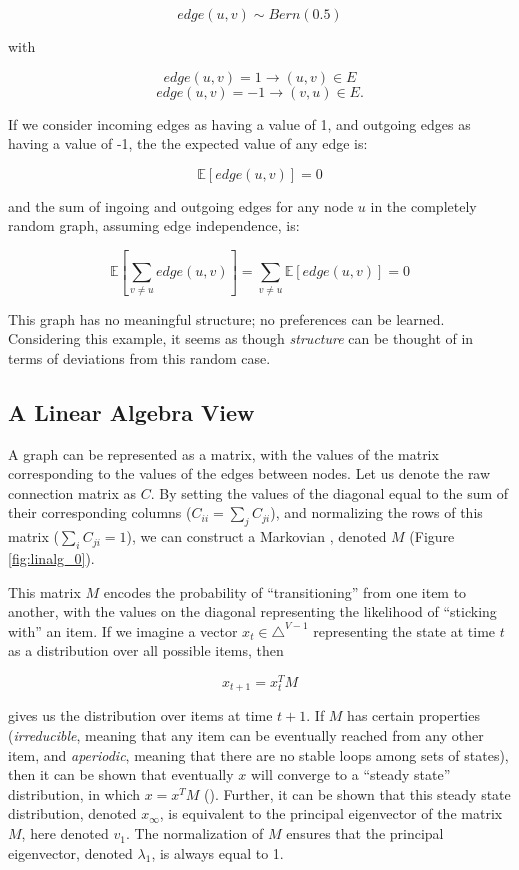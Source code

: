 \[
edge(u,v) \sim Bern(0.5)
\]

with 

\[
edge(u,v) = 1 \rightarrow (u,v) \in E
\]
\[
edge(u,v) = -1 \rightarrow (v,u) \in E.
\]

If we consider incoming edges as having a value of 1, and outgoing edges as having a value of -1, the the expected value of any edge is:

\[
\mathbb{E}[edge(u,v)] = 0
\]

and the sum of ingoing and outgoing edges for any node $u$ in the completely random graph, assuming edge independence, is:

\[
\mathbb{E}\left[\sum_{v \neq u} edge(u,v)\right] = \sum_{v \neq u}\mathbb{E}[edge(u,v)] = 0
\]

This graph has no meaningful structure; no preferences can be learned.
Considering this example, it seems as though \textit{structure} can be thought of in terms of deviations from this random case.

\subsection{A Linear Algebra View}

A graph can be represented as a matrix, with the values of the matrix corresponding to the values of the edges between nodes.
Let us denote the raw connection matrix as $C$.
By setting the values of the diagonal equal to the sum of their corresponding columns ($C_{ii} = \sum_j C_{ji}$), and normalizing the rows of this matrix ($\sum_i C_{ji} = 1$), we can construct a Markovian , denoted $M$ (Figure \ref{fig:linalg_0}).

This matrix $M$ encodes the probability of ``transitioning'' from one item to another, with the values on the diagonal representing the likelihood of ``sticking with'' an item. 
If we imagine a vector $x_t \in \triangle^{V-1}$ representing the state at time $t$ as a distribution over all possible items, then

\[
x_{t+1} = x_t^TM
\]

gives us the distribution over items at time $t+1$.
If $M$ has certain properties (\textit{irreducible}, meaning that any item can be eventually reached from any other item, and \textit{aperiodic}, meaning that there are no stable loops among sets of states), then it can be shown that eventually $x$ will converge to a ``steady state'' distribution, in which $x = x^TM$ (\cite{lin:2016}).
Further, it can be shown that this steady state distribution, denoted $x_{\infty}$, is equivalent to the principal eigenvector of the matrix $M$, here denoted $v_1$.
The normalization of $M$ ensures that the principal eigenvector, denoted $\lambda_1$, is always equal to 1.

